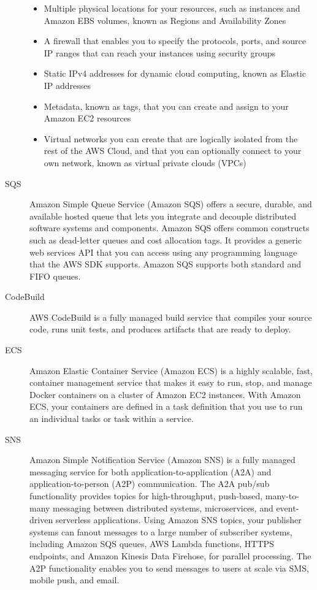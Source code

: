 \begin{multicols}{2}
\begin{description}
\begin{itemize}
\item Multiple physical locations for your resources, such as instances and Amazon EBS volumes, known as Regions and Availability Zones
\item A firewall that enables you to specify the protocols, ports, and source IP ranges that can reach your instances using security groups
\item Static IPv4 addresses for dynamic cloud computing, known as Elastic IP addresses
\item Metadata, known as tags, that you can create and assign to your Amazon EC2 resources
\item Virtual networks you can create that are logically isolated from the rest of the AWS Cloud, and that you can optionally connect to your own network, known as virtual private clouds (VPCs)
\end{itemize}
\item[SQS] Amazon Simple Queue Service (Amazon SQS) offers a secure, durable, and available hosted queue that lets you integrate and decouple distributed software systems and components. Amazon SQS offers common constructs such as dead-letter queues and cost allocation tags. It provides a generic web services API that you can access using any programming language that the AWS SDK supports. Amazon SQS supports both standard and FIFO queues.
\item[CodeBuild] AWS CodeBuild is a fully managed build service that compiles your source code, runs unit tests, and produces artifacts that are ready to deploy.
\item[ECS] Amazon Elastic Container Service (Amazon ECS) is a highly scalable, fast, container management service that makes it easy to run, stop, and manage Docker containers on a cluster of Amazon EC2 instances.  With Amazon ECS, your containers are defined in a task definition that you use to run an individual tasks or task within a service.
\item[SNS] Amazon Simple Notification Service (Amazon SNS) is a fully managed messaging service for both application-to-application (A2A) and application-to-person (A2P) communication. The A2A pub/sub functionality provides topics for high-throughput, push-based, many-to-many messaging between distributed systems, microservices, and event-driven serverless applications. Using Amazon SNS topics, your publisher systems can fanout messages to a large number of subscriber systems, including Amazon SQS queues, AWS Lambda functions, HTTPS endpoints, and Amazon Kinesis Data Firehose, for parallel processing. The A2P functionality enables you to send messages to users at scale via SMS, mobile push, and email.

\end{description}
\end{multicols}
